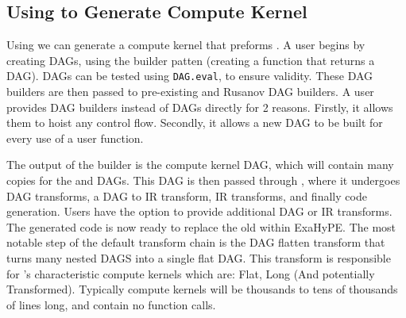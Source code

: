 \subsection{Using \phlat to Generate Compute Kernel}
Using \phlat we can generate a compute kernel that preforms .
A user begins by creating  DAGs, using the builder patten (creating a function that returns a DAG).
DAGs can be tested using \texttt{DAG.eval}, to ensure validity.
These DAG builders are then passed to pre-existing  and Rusanov DAG builders.
A user provides DAG builders instead of DAGs directly for 2 reasons.
Firstly, it allows them to hoist any control flow.
Secondly, it allows a new DAG to be built for every use of a user function.

The output of the  builder is the compute kernel DAG, which will contain many copies for the  and  DAGs.
This DAG is then passed through \phlat, where it undergoes DAG transforms, a DAG to IR transform, IR transforms, and finally code generation.
Users have the option to provide additional DAG or IR transforms.
The generated code is now ready to replace the old  within ExaHyPE.
The most notable step of the default transform chain is the DAG flatten transform that turns many nested DAGS into a single flat DAG.
This transform is responsible for \phlat's characteristic compute kernels which are: Flat, Long (And potentially Transformed).
Typically compute kernels will be thousands to tens of thousands of lines long, and contain no function calls.   
